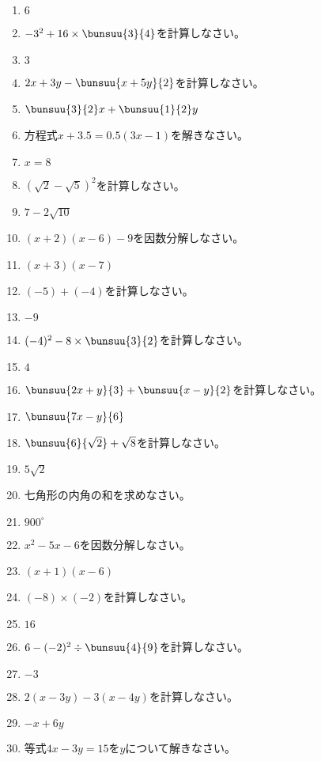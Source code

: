\documentclass[uplatex,a4j,11pt]{jsreport}
\begin{document}
\begin{multicols}{2}
\begin{enumerate}
    \item $6$
    \item $-3^2+16\times \bunsuu{3}{4}$\quad を計算しなさい。%
    \item $3$
    \item $2x+3y-\bunsuu{x+5y}{2}$\quad を計算しなさい。%
    \item $\bunsuu{3}{2}x+\bunsuu{1}{2}y$
    \item 方程式\quad$x+3.5=0.5(3x-1)$\quad を解きなさい。%
    \item $x=8$
    \item $(\sqrt{2}-\sqrt{5})^2$\quad を計算しなさい。%
    \item $7-2\sqrt{10}$
    \item $(x+2)(x-6)-9$\quad を因数分解しなさい。%
    \item $(x+3)(x-7)$
    \item $(-5)+(-4)$\quad を計算しなさい。%
    \item $-9$
    \item $(-4)^2-8\times \bunsuu{3}{2}$\quad を計算しなさい。%
    \item $4$
    \item $\bunsuu{2x+y}{3}+\bunsuu{x-y}{2}$\quad を計算しなさい。%
    \item $\bunsuu{7x-y}{6}$
    \item $\bunsuu{6}{\sqrt{2}}+\sqrt{8}$\quad を計算しなさい。%
    \item $5\sqrt{2}$
    \item 七角形の内角の和を求めなさい。%
    \item $900^\circ$
    \item $x^2-5x-6$\quad を因数分解しなさい。%
    \item $(x+1)(x-6)$
    \item $(-8)\times (-2)$\quad を計算しなさい。%
    \item $16$
    \item $6-(-2)^2\div \bunsuu{4}{9}$\quad を計算しなさい。%
    \item $-3$
    \item $2(x-3y)-3(x-4y)$\quad を計算しなさい。%
    \item $-x+6y$
    \item 等式\quad$4x-3y=15$\quad を\quad$y$\quad について解きなさい。%

\end{enumerate}
\end{multicols}
\end{document}
